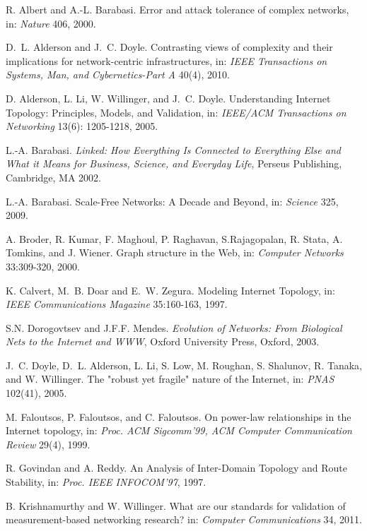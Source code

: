 \documentclass{sig-alternate-10pt}
\begin{document}
{\normalsize
\begin{thebibliography}{99}

R. Albert and A.-L. Barabasi.
Error and attack tolerance of complex networks,
in: {\em Nature} 406, 2000.

D.~L. Alderson and J.~C. Doyle. Contrasting views of complexity and their implications for network-centric infrastructures, 
in: {\em IEEE Transactions on Systems, Man, and Cybernetics-Part A} 40(4), 2010.

D. Alderson, L. Li, W. Willinger, and J.~C. Doyle. Understanding Internet Topology: Principles, Models, and Validation, in: {\em IEEE/ACM Transactions on Networking} 13(6): 1205-1218, 2005.

L.-A. Barabasi.
{\em Linked: How Everything Is Connected to Everything Else and What it Means for Business, Science, and Everyday Life}, Perseus Publishing, Cambridge, MA 2002.

L.-A. Barabasi. Scale-Free Networks: A Decade and Beyond, in: {\em Science} 325, 2009.

A. Broder, R. Kumar, F. Maghoul, P. Raghavan, S.Rajagopalan, R. Stata, A. Tomkins, and J. Wiener. Graph structure in the Web, in: {\em Computer Networks} 33:309-320, 2000. 

K. Calvert, M.~B. Doar and E.~W. Zegura. Modeling Internet Topology, in: {\em IEEE Communications Magazine} 35:160-163, 1997.

S.N. Dorogovtsev and J.F.F. Mendes.
{\em Evolution of Networks: From Biological Nets to the Internet and WWW}, Oxford University Press, Oxford, 2003.

J.~C. Doyle, D.~L. Alderson, L. Li, S. Low, M. Roughan, S. Shalunov, R. Tanaka, and W. Willinger. The "robust yet fragile" nature of the Internet, in: {\em PNAS} 102(41), 2005.

M. Faloutsos, P. Faloutsos, and C. Faloutsos. On power-law relationships in the Internet topology, in: {\em Proc. ACM Sigcomm'99, ACM Computer Communication Review} 29(4), 1999.

R. Govindan and A. Reddy. An Analysis of Inter-Domain Topology and Route Stability, in: {\em Proc. IEEE INFOCOM'97}, 1997.

B. Krishnamurthy and W. Willinger. What are our standards for validation of measurement-based networking research? in: {\em Computer Communications} 34, 2011.


\end{thebibliography}}
\end{document}
